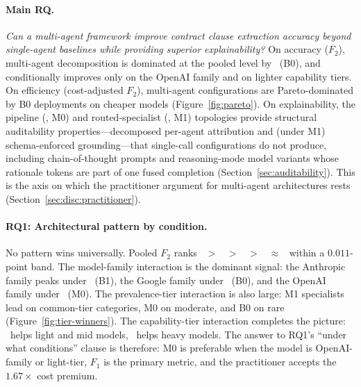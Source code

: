 \paragraph{Main RQ.}
\emph{Can a multi-agent framework improve contract clause extraction accuracy
beyond single-agent baselines while providing superior explainability?}
On accuracy ($F_2$), multi-agent decomposition is dominated at the pooled
level by \cfgZS\ (B0), and conditionally improves only on the
OpenAI family and on lighter capability tiers. On efficiency
(cost-adjusted $F_2$), multi-agent configurations are Pareto-dominated by B0
deployments on cheaper models (Figure~\ref{fig:pareto}). On explainability,
the pipeline (\cfgCX, M0) and routed-specialist (\cfgMA, M1) topologies
provide structural auditability properties---decomposed per-agent
attribution and (under M1) schema-enforced grounding---that single-call
configurations do not produce, including chain-of-thought prompts and
reasoning-mode model variants whose rationale tokens are part of one
fused completion (Section~\ref{sec:auditability}). This is the axis on
which the practitioner argument for multi-agent architectures rests
(Section~\ref{sec:disc:practitioner}).

\paragraph{RQ1: Architectural pattern by condition.}
No pattern wins universally. Pooled $F_2$ ranks \cfgZS\ $>$ \cfgCoT\ $>$
\cfgCX\ $>$ \cfgMA\ $\approx$ \cfgCP\ within a $0.011$-point band. The
model-family interaction is the dominant signal: the Anthropic family peaks
under \cfgCoT\ (B1), the Google family under \cfgZS\ (B0), and the OpenAI
family under \cfgCX\ (M0). The prevalence-tier interaction is also large: M1
specialists lead on common-tier categories, M0 on moderate, and B0 on rare
(Figure~\ref{fig:tier-winners}). The capability-tier interaction completes the
picture: \cfgCX\ helps light and mid models, \cfgZS\ helps heavy models. The
answer to RQ1's ``under what conditions'' clause is therefore: M0 is preferable
when the model is OpenAI-family or light-tier,
$F_1$ is the primary metric, and the practitioner accepts the $1.67\times$
cost premium.

